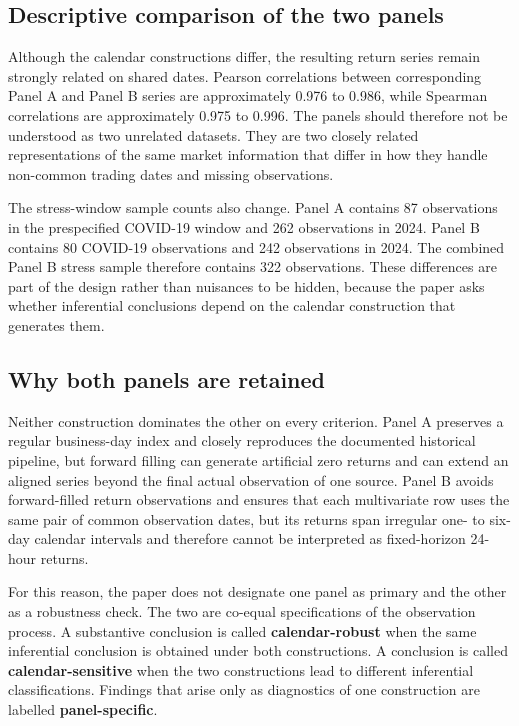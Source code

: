 \subsection{Descriptive comparison of the two panels}

Although the calendar constructions differ, the resulting return series remain strongly related on shared dates. Pearson correlations between corresponding Panel A and Panel B series are approximately 0.976 to 0.986, while Spearman correlations are approximately 0.975 to 0.996. The panels should therefore not be understood as two unrelated datasets. They are two closely related representations of the same market information that differ in how they handle non-common trading dates and missing observations.

The stress-window sample counts also change. Panel A contains 87 observations in the prespecified COVID-19 window and 262 observations in 2024. Panel B contains 80 COVID-19 observations and 242 observations in 2024. The combined Panel B stress sample therefore contains 322 observations. These differences are part of the design rather than nuisances to be hidden, because the paper asks whether inferential conclusions depend on the calendar construction that generates them.

\subsection{Why both panels are retained}

Neither construction dominates the other on every criterion. Panel A preserves a regular business-day index and closely reproduces the documented historical pipeline, but forward filling can generate artificial zero returns and can extend an aligned series beyond the final actual observation of one source. Panel B avoids forward-filled return observations and ensures that each multivariate row uses the same pair of common observation dates, but its returns span irregular one- to six-day calendar intervals and therefore cannot be interpreted as fixed-horizon 24-hour returns.

For this reason, the paper does not designate one panel as primary and the other as a robustness check. The two are co-equal specifications of the observation process. A substantive conclusion is called \textbf{calendar-robust} when the same inferential conclusion is obtained under both constructions. A conclusion is called \textbf{calendar-sensitive} when the two constructions lead to different inferential classifications. Findings that arise only as diagnostics of one construction are labelled \textbf{panel-specific}.

